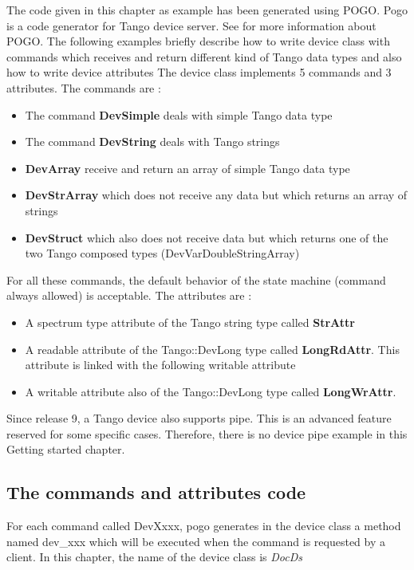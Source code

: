 The code given in this chapter as example has been generated using
POGO. Pogo is a code generator for Tango device server.
See \cite{Pogo doc} for more information about POGO. The following
examples briefly describe how to write device class with commands
which receives and return different kind of Tango data types and also
how to write device attributes The device class
implements 5 commands and 3 attributes. The commands are :
\begin{itemize}
\item The command \textbf{DevSimple} deals with simple Tango data type
\item The command \textbf{DevString} deals with Tango strings
\item \textbf{DevArray} receive and return an array of simple Tango data
type
\item \textbf{DevStrArray} which does not receive any data but which returns
an array of strings
\item \textbf{DevStruct} which also does not receive data but which returns
one of the two Tango composed types (DevVarDoubleStringArray)
\end{itemize}
For all these commands, the default behavior of the state machine
(command always allowed) is acceptable. The attributes are :
\begin{itemize}
\item A spectrum type attribute of the Tango string type called \textbf{StrAttr}
\item A readable attribute of the Tango::DevLong type called \textbf{LongRdAttr}.
This attribute is linked with the following writable attribute
\item A writable attribute also of the Tango::DevLong type called \textbf{LongWrAttr}.
\end{itemize}
Since release 9, a Tango device also supports pipe. This is an advanced
feature reserved for some specific cases. Therefore, there is no device
pipe example in this \textquotedbl{}Getting started\textquotedbl{}
chapter.


\subsection{The commands and attributes code}

For each command called DevXxxx, pogo generates in the device class
a method named dev\_xxx which will be executed when the command is
requested by a client. In this chapter, the name of the device class
is \emph{DocDs}


